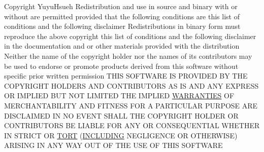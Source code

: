 \begin{DoxyCompactItemize}
Copyright Yuyu\+Hsueh Redistribution and use in source and binary with or without are permitted provided that the following conditions are this list of conditions and the following disclaimer Redistributions in binary form must reproduce the above copyright this list of conditions and the following disclaimer in the documentation and or other materials provided with the distribution Neither the name of the copyright holder nor the names of its contributors may be used to endorse or promote products derived from this software without specific prior written permission T\+H\+IS S\+O\+F\+T\+W\+A\+RE IS P\+R\+O\+V\+I\+D\+ED BY T\+HE C\+O\+P\+Y\+R\+I\+G\+HT H\+O\+L\+D\+E\+RS A\+ND C\+O\+N\+T\+R\+I\+B\+U\+T\+O\+RS AS IS A\+ND A\+NY E\+X\+P\+R\+E\+SS OR I\+M\+P\+L\+I\+ED B\+UT N\+OT L\+I\+M\+I\+T\+ED T\+HE I\+M\+P\+L\+I\+ED \hyperlink{license_8txt_a042eb66328050ad88743187ae8e43b95}{W\+A\+R\+R\+A\+N\+T\+I\+ES} OF M\+E\+R\+C\+H\+A\+N\+T\+A\+B\+I\+L\+I\+TY A\+ND F\+I\+T\+N\+E\+SS F\+OR A P\+A\+R\+T\+I\+C\+U\+L\+AR P\+U\+R\+P\+O\+SE A\+RE D\+I\+S\+C\+L\+A\+I\+M\+ED IN NO E\+V\+E\+NT S\+H\+A\+LL T\+HE C\+O\+P\+Y\+R\+I\+G\+HT H\+O\+L\+D\+ER OR C\+O\+N\+T\+R\+I\+B\+U\+T\+O\+RS BE L\+I\+A\+B\+LE F\+OR A\+NY OR C\+O\+N\+S\+E\+Q\+U\+E\+N\+T\+I\+AL W\+H\+E\+T\+H\+ER IN S\+T\+R\+I\+CT OR \hyperlink{license_8txt_a053f3866e9a0ed6d815ff119b776cf19}{T\+O\+RT} (\hyperlink{license_8txt_ac6699313e23a90e93d8db75154e2e689}{I\+N\+C\+L\+U\+D\+I\+NG} N\+E\+G\+L\+I\+G\+E\+N\+CE OR O\+T\+H\+E\+R\+W\+I\+SE) A\+R\+I\+S\+I\+NG IN A\+NY W\+AY O\+UT OF T\+HE U\+SE OF T\+H\+IS S\+O\+F\+T\+W\+A\+RE
\end{DoxyCompactItemize}
